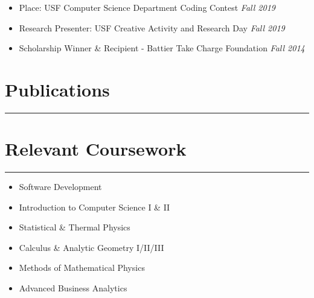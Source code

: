 \documentclass[11pt,a4paper]{article}
\newenvironment{myitemize}
{ \begin{itemize}[label={--}, leftmargin=*]
    \setlength{\itemsep}{0pt}
    \setlength{\parskip}{0pt}
    \setlength{\parsep}{0pt}     }
{ \end{itemize}                  }
\begin{document}
\begin{myitemize}
\item {} Place: USF Computer Science Department Coding Contest \hfill{\textit{Fall 2019} }
\item Research Presenter: USF Creative Activity and Research Day \hfill{\textit{Fall 2019} }
\item Scholarship Winner \& Recipient - Battier Take Charge Foundation \hfill{\textit{Fall 2014}}
\end{myitemize}

\section*{Publications}
\vspace{-3mm} %

\hrule
\vspace{3mm} %



\section*{Relevant Coursework}
\vspace{-3mm} %
\hrule

\begin{multicols}{2}
\begin{itemize}[noitemsep] %
    \item Software Development
    \item Introduction to Computer Science I \& II
    \item Statistical \& Thermal Physics
    \item Calculus \& Analytic Geometry I/II/III
    \item Methods of Mathematical Physics
    \item Advanced Business Analytics
\end{itemize}

\end{multicols}
\end{document}
